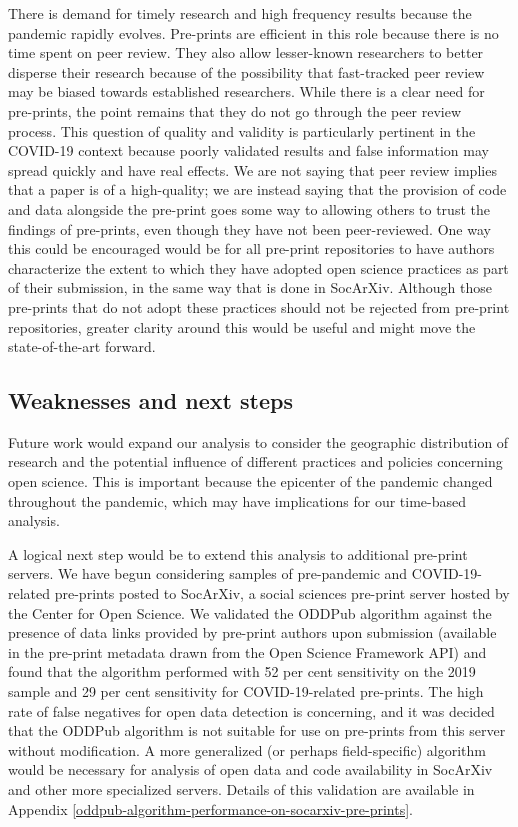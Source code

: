 \documentclass[
]{article}
\begin{document}
There is demand for timely research and high frequency results because the pandemic rapidly evolves. Pre-prints are efficient in this role because there is no time spent on peer review. They also allow lesser-known researchers to better disperse their research because of the possibility that fast-tracked peer review may be biased towards established researchers. While there is a clear need for pre-prints, the point remains that they do not go through the peer review process. This question of quality and validity is particularly pertinent in the COVID-19 context because poorly validated results and false information may spread quickly and have real effects. We are not saying that peer review implies that a paper is of a high-quality; we are instead saying that the provision of code and data alongside the pre-print goes some way to allowing others to trust the findings of pre-prints, even though they have not been peer-reviewed. One way this could be encouraged would be for all pre-print repositories to have authors characterize the extent to which they have adopted open science practices as part of their submission, in the same way that is done in SocArXiv. Although those pre-prints that do not adopt these practices should not be rejected from pre-print repositories, greater clarity around this would be useful and might move the state-of-the-art forward.

\hypertarget{weaknesses-and-next-steps}{%
\subsection{Weaknesses and next steps}\label{weaknesses-and-next-steps}}

Future work would expand our analysis to consider the geographic distribution of research and the potential influence of different practices and policies concerning open science. This is important because the epicenter of the pandemic changed throughout the pandemic, which may have implications for our time-based analysis.

A logical next step would be to extend this analysis to additional pre-print servers. We have begun considering samples of pre-pandemic and COVID-19-related pre-prints posted to SocArXiv, a social sciences pre-print server hosted by the Center for Open Science. We validated the ODDPub algorithm against the presence of data links provided by pre-print authors upon submission (available in the pre-print metadata drawn from the Open Science Framework API) and found that the algorithm performed with 52 per cent sensitivity on the 2019 sample and 29 per cent sensitivity for COVID-19-related pre-prints. The high rate of false negatives for open data detection is concerning, and it was decided that the ODDPub algorithm is not suitable for use on pre-prints from this server without modification. A more generalized (or perhaps field-specific) algorithm would be necessary for analysis of open data and code availability in SocArXiv and other more specialized servers. Details of this validation are available in Appendix \ref{oddpub-algorithm-performance-on-socarxiv-pre-prints}.
\end{document}
